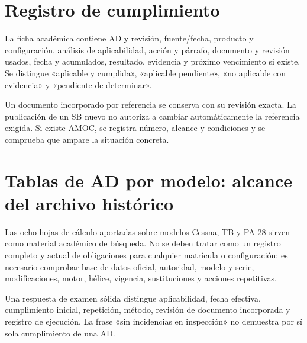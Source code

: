 \section{Registro de cumplimiento}
La ficha académica contiene AD y revisión, fuente/fecha, producto y configuración, análisis de aplicabilidad, acción y párrafo, documento y revisión usados, fecha y acumulados, resultado, evidencia y próximo vencimiento si existe. Se distingue «aplicable y cumplida», «aplicable pendiente», «no aplicable con evidencia» y «pendiente de determinar».

Un documento incorporado por referencia se conserva con su revisión exacta. La publicación de un SB nuevo no autoriza a cambiar automáticamente la referencia exigida. Si existe AMOC, se registra número, alcance y condiciones y se comprueba que ampare la situación concreta.
\section{Tablas de AD por modelo: alcance del archivo histórico}
Las ocho hojas de cálculo aportadas sobre modelos Cessna, TB y PA-28 sirven como material académico de búsqueda. No se deben tratar como un registro completo y actual de obligaciones para cualquier matrícula o configuración: es necesario comprobar base de datos oficial, autoridad, modelo y serie, modificaciones, motor, hélice, vigencia, sustituciones y acciones repetitivas.

Una respuesta de examen sólida distingue aplicabilidad, fecha efectiva, cumplimiento inicial, repetición, método, revisión de documento incorporada y registro de ejecución. La frase «sin incidencias en inspección» no demuestra por sí sola cumplimiento de una AD.


